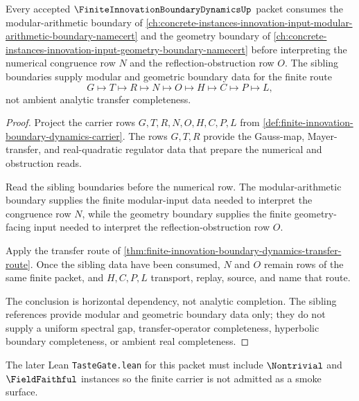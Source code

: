 \begin{theorem}
\label{thm:finite-innovation-boundary-dynamics-sibling-route}
Every accepted $\FiniteInnovationBoundaryDynamicsUp$ packet consumes the modular-arithmetic boundary of \autoref{ch:concrete-instances-innovation-input-modular-arithmetic-boundary-namecert} and the geometry boundary of \autoref{ch:concrete-instances-innovation-input-geometry-boundary-namecert} before interpreting the numerical congruence row $N$ and the reflection-obstruction row $O$. The sibling boundaries supply modular and geometric boundary data for the finite route
$$
G \longmapsto T \longmapsto R \longmapsto N \longmapsto O \longmapsto H \longmapsto C \longmapsto P \longmapsto L,
$$
not ambient analytic transfer completeness.
\end{theorem}
\begin{proof}
Project the carrier rows $G,T,R,N,O,H,C,P,L$ from \autoref{def:finite-innovation-boundary-dynamics-carrier}. The rows $G,T,R$ provide the Gauss-map, Mayer-transfer, and real-quadratic regulator data that prepare the numerical and obstruction reads.

Read the sibling boundaries before the numerical row. The modular-arithmetic boundary supplies the finite modular-input data needed to interpret the congruence row $N$, while the geometry boundary supplies the finite geometry-facing input needed to interpret the reflection-obstruction row $O$.

Apply the transfer route of \autoref{thm:finite-innovation-boundary-dynamics-transfer-route}. Once the sibling data have been consumed, $N$ and $O$ remain rows of the same finite packet, and $H,C,P,L$ transport, replay, source, and name that route.

The conclusion is horizontal dependency, not analytic completion. The sibling references provide modular and geometric boundary data only; they do not supply a uniform spectral gap, transfer-operator completeness, hyperbolic boundary completeness, or ambient real completeness.
\end{proof}

The later Lean \texttt{TasteGate.lean} for this packet must include $\Nontrivial$ and $\FieldFaithful$ instances so the finite carrier is not admitted as a smoke surface.



